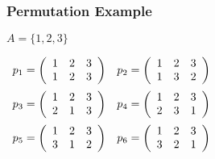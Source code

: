 \documentclass[dvipsnames]{beamer}
\begin{document}
\begin{frame}
  \frametitle{Permutation Example}

  \begin{example}
    $A = \{1,2,3\}$

    \medskip
    $\begin{array}{cc}
      p_1 = \left(
        \begin{array}{ccc}
          1 & 2 & 3\\
          1 & 2 & 3
        \end{array}
      \right) &
      p_2 = \left(
        \begin{array}{ccc}
          1 & 2 & 3\\
          1 & 3 & 2
        \end{array}
      \right)\medskip\\
      p_3 = \left(
        \begin{array}{ccc}
          1 & 2 & 3\\
          2 & 1 & 3
        \end{array}
      \right) &
      p_4 = \left(
        \begin{array}{ccc}
          1 & 2 & 3\\
          2 & 3 & 1
        \end{array}
      \right)\medskip\\
      p_5 = \left(
        \begin{array}{ccc}
          1 & 2 & 3\\
          3 & 1 & 2
        \end{array}
      \right) &
      p_6 = \left(
        \begin{array}{ccc}
          1 & 2 & 3\\
          3 & 2 & 1
        \end{array}
      \right)
    \end{array}$
  \end{example}
\end{frame}
\end{document}
